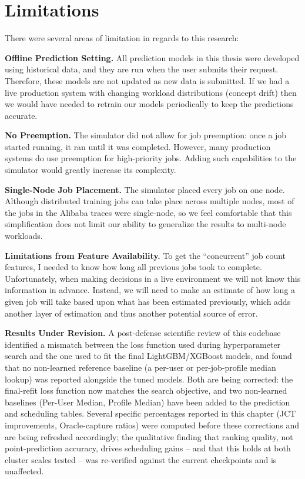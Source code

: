 \section{Limitations}

There were several areas of limitation in regards to this research:

\textbf{Offline Prediction Setting.} All prediction models in this thesis were developed using historical data, and they are run when the user submits their request. Therefore, these models are not updated as new data is submitted. If we had a live production system with changing workload distributions (concept drift) then we would have needed to retrain our models periodically to keep the predictions accurate.

\textbf{No Preemption.} The simulator did not allow for job preemption: once a job started running, it ran until it was completed. However, many production systems do use preemption for high-priority jobs. Adding such capabilities to the simulator would greatly increase its complexity.

\textbf{Single-Node Job Placement.} The simulator placed every job on one node. Although distributed training jobs can take place across multiple nodes, most of the jobs in the Alibaba traces were single-node, so we feel comfortable that this simplification does not limit our ability to generalize the results to multi-node workloads.

\textbf{Limitations from Feature Availability.} To get the ``concurrent'' job count features, I needed to know how long all previous jobs took to complete. Unfortunately, when making decisions in a live environment we will not know this information in advance. Instead, we will need to make an estimate of how long a given job will take based upon what has been estimated previously, which adds another layer of estimation and thus another potential source of error.

\textbf{Results Under Revision.} A post-defense scientific review of this codebase identified a mismatch between the loss function used during hyperparameter search and the one used to fit the final LightGBM/XGBoost models, and found that no non-learned reference baseline (a per-user or per-job-profile median lookup) was reported alongside the tuned models. Both are being corrected: the final-refit loss function now matches the search objective, and two non-learned baselines (Per-User Median, Profile Median) have been added to the prediction and scheduling tables. Several specific percentages reported in this chapter (JCT improvements, Oracle-capture ratios) were computed before these corrections and are being refreshed accordingly; the qualitative finding that ranking quality, not point-prediction accuracy, drives scheduling gains -- and that this holds at both cluster scales tested -- was re-verified against the current checkpoints and is unaffected.


